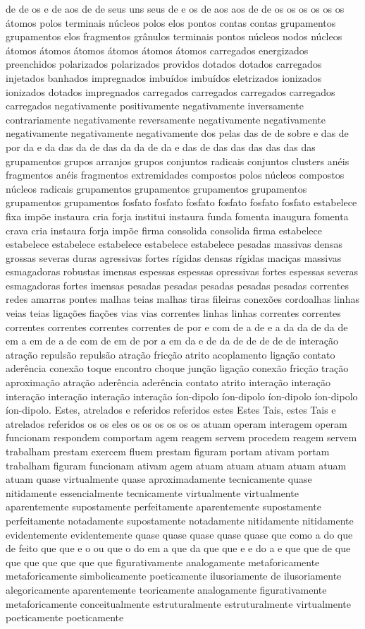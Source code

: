 de de os e de aos de de seus uns seus de e os de aos aos de de os os os os os os átomos polos terminais núcleos polos elos pontos contas contas grupamentos grupamentos elos fragmentos grânulos terminais pontos núcleos nodos núcleos átomos átomos átomos átomos átomos átomos carregados energizados preenchidos polarizados polarizados providos dotados dotados carregados injetados banhados impregnados imbuídos imbuídos eletrizados ionizados ionizados dotados impregnados carregados carregados carregados carregados carregados negativamente positivamente negativamente inversamente contrariamente negativamente reversamente negativamente negativamente negativamente negativamente negativamente dos pelas das de de sobre e das de por da e da das da de das da da de da e das de das das das das das das grupamentos grupos arranjos grupos conjuntos radicais conjuntos clusters anéis fragmentos anéis fragmentos extremidades compostos polos núcleos compostos núcleos radicais grupamentos grupamentos grupamentos grupamentos grupamentos grupamentos fosfato fosfato fosfato fosfato fosfato fosfato estabelece fixa impõe instaura cria forja institui instaura funda fomenta inaugura fomenta crava cria instaura forja impõe firma consolida consolida firma estabelece estabelece estabelece estabelece estabelece estabelece pesadas massivas densas grossas severas duras agressivas fortes rígidas densas rígidas maciças massivas esmagadoras robustas imensas espessas espessas opressivas fortes espessas severas esmagadoras fortes imensas pesadas pesadas pesadas pesadas pesadas correntes redes amarras pontes malhas teias malhas tiras fileiras conexões cordoalhas linhas veias teias ligações fiações vias vias correntes linhas linhas correntes correntes correntes correntes correntes correntes de por e com de a de e a da da de da de em a em de a de com de em de por a em da e de da de de de de de interação atração repulsão repulsão atração fricção atrito acoplamento ligação contato aderência conexão toque encontro choque junção ligação conexão fricção tração aproximação atração aderência aderência contato atrito interação interação interação interação interação interação íon-dipolo íon-dipolo íon-dipolo íon-dipolo íon-dipolo. Estes, atrelados e referidos referidos estes Estes Tais, estes Tais e atrelados referidos os os eles os os os os os os atuam operam interagem operam funcionam respondem comportam agem reagem servem procedem reagem servem trabalham prestam exercem fluem prestam figuram portam ativam portam trabalham figuram funcionam ativam agem atuam atuam atuam atuam atuam atuam quase virtualmente quase aproximadamente tecnicamente quase nitidamente essencialmente tecnicamente virtualmente virtualmente aparentemente supostamente perfeitamente aparentemente supostamente perfeitamente notadamente supostamente notadamente nitidamente nitidamente evidentemente evidentemente quase quase quase quase quase que como a do que de feito que que e o ou que o do em a que da que que e e do a e que que de que que que que que que que figurativamente analogamente metaforicamente metaforicamente simbolicamente poeticamente ilusoriamente de ilusoriamente alegoricamente aparentemente teoricamente analogamente figurativamente metaforicamente conceitualmente estruturalmente estruturalmente virtualmente poeticamente poeticamente 